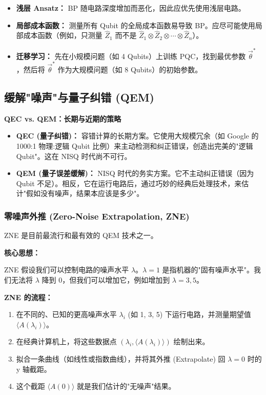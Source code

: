 \documentclass[11pt,a4paper]{article}
\begin{document}
\begin{itemize}
\item \textbf{浅层 Ansatz：} BP 随电路深度增加而恶化，因此应优先使用浅层电路。
\item \textbf{局部成本函数：} 测量所有 Qubit 的全局成本函数易导致 BP。应尽可能使用局部成本函数（例如，只测量 $\hat{Z}_1$ 而不是 $\hat{Z}_1 \otimes \hat{Z}_2 \otimes \cdots \otimes \hat{Z}_n$）。
\item \textbf{迁移学习：} 先在小规模问题（如 4 Qubits）上训练 PQC，找到最优参数 $\vec{\theta}^*$，然后将 $\vec{\theta}^*$ 作为大规模问题（如 8 Qubits）的初始参数。
\end{itemize}

\subsection{缓解"噪声"与量子纠错 (QEM)}

\textbf{QEC vs. QEM：长期与近期的策略}

\begin{itemize}
\item \textbf{QEC (量子纠错)：} 容错计算的长期方案。它使用大规模冗余（如 Google 的 1000:1 物理:逻辑 Qubit 比例）来主动检测和纠正错误，创造出完美的"逻辑 Qubit"。这在 NISQ 时代尚不可行。
\item \textbf{QEM (量子误差缓解)：} NISQ 时代的务实方案。它不主动纠正错误（因为 Qubit 不足）。相反，它在运行电路后，通过巧妙的经典后处理技术，来估计"假如没有噪声，结果本应该是多少"。
\end{itemize}

\subsubsection{零噪声外推 (Zero-Noise Extrapolation, ZNE)}

ZNE 是目前最流行和最有效的 QEM 技术之一。

\textbf{核心思想：}

ZNE 假设我们可以控制电路的噪声水平 $\lambda$。$\lambda=1$ 是指机器的"固有噪声水平"。我们无法将 $\lambda$ 降到 0，但我们可以增加它，例如增加到 $\lambda=3, 5$。

\textbf{ZNE 的流程：}

\begin{enumerate}
\item 在不同的、已知的更高噪声水平 $\lambda_i$ (如 1, 3, 5) 下运行电路，并测量期望值 $\langle A(\lambda_i) \rangle$。
\item 在经典计算机上，将这些数据点 $(\lambda_i, \langle A(\lambda_i) \rangle)$ 绘制出来。
\item 拟合一条曲线（如线性或指数曲线），并将其外推 (Extrapolate) 回 $\lambda=0$ 时的 y 轴截距。
\item 这个截距 $\langle A(0) \rangle$ 就是我们估计的"无噪声"结果。
\end{enumerate}
\end{document}
